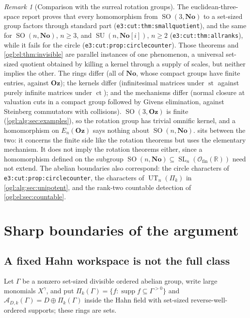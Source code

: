 \documentclass[11pt,oneside]{article}
\numberwithin{equation}{section}
\theoremstyle{definition}
\theoremstyle{remark}
\newtheorem{remark}[remark]{Remark}
\newcommand{\No}{\mathbf{No}}
\newcommand{\Oz}{\mathbf{Oz}}
\newcommand{\SC}{\No[i]}
\newcommand{\R}{\mathbb R}
\newcommand{\A}{\mathcal A}
\newcommand{\Ofin}{\mathcal O_{\mathrm{fin}}}
\newcommand{\ct}{\operatorname{ct}}
\newcommand{\st}{\operatorname{st}}
\newcommand{\supp}{\operatorname{supp}}
\newcommand{\SL}{\operatorname{SL}}
\newcommand{\SO}{\operatorname{SO}}
\newcommand{\SU}{\operatorname{SU}}
\newcommand{\UT}{\operatorname{UT}}
\newcommand{\replabel}[1]{\nolinkurl{#1}}
\begin{document}
\begin{remark}[Comparison with the surreal rotation groups]\label{ogl:el:rem:e3}
The euclidean-three-space report proves that every homomorphism from
$\SO(3,\No)$ to a set-sized group factors through standard part
(\replabel{e3:cut:thm:smallquotient}), and the same for $\SO(n,\No)$, $n\ge3$,
and $\SU(n,\SC)$, $n\ge2$ (\replabel{e3:cut:thm:allranks}), while it fails for
the circle (\replabel{e3:cut:prop:circlecounter}). Those theorems and
\cref{ogl:el:thm:invisible} are parallel instances of one phenomenon, a
universal set-sized quotient obtained by killing a kernel through a supply of
scales, but neither implies the other. The rings differ (all of $\No$, whose
compact groups have finite entries, against $\Oz$); the kernels differ
(infinitesimal matrices under $\st$ against purely infinite matrices under
$\ct$); and the mechanisms differ (normal closure at valuation cuts in a compact
group followed by Givens elimination, against Steinberg commutators with
collisions). $\SO(3,\Oz)$ is finite (\cref{ogl:alg:sec:examples}), so the
rotation group has trivial omnific kernel, and a homomorphism on $E_n(\Oz)$ says
nothing about $\SO(n,\No)$.  sits between the two:
it concerns the finite side like the rotation theorems but uses the elementary
mechanism. It does not imply the rotation theorems either, since a homomorphism
defined on the subgroup $\SO(n,\No)\subseteq\SL_n(\Ofin(\R))$ need not extend. The
abelian boundaries also correspond: the circle characters of
\replabel{e3:cut:prop:circlecounter}, the characters of $\UT_n(\Pi_k)$ in
\cref{ogl:alg:sec:unipotent}, and the rank-two countable detection of
\cref{ogl:el:sec:countable}.
\end{remark}

\section{Sharp boundaries of the argument}\label{ogl:el:sec:boundaries}

\subsection{A fixed Hahn workspace is not the full class}

Let $\Gamma$ be a nonzero set-sized divisible ordered abelian group, write
large monomials $X^\gamma$, and put $\Pi_k(\Gamma)=\{f:\supp f\subseteq\Gamma^{>0}\}$
and $\A_{D,k}(\Gamma)=D\oplus\Pi_k(\Gamma)$ inside the Hahn field with set-sized
reverse-well-ordered supports; these rings are sets.
\end{document}
